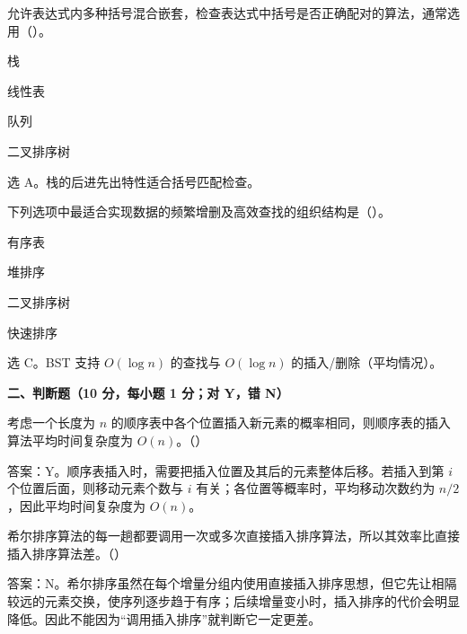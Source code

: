 \begin{question}
允许表达式内多种括号混合嵌套，检查表达式中括号是否正确配对的算法，通常选用（\quad）。
\begin{choiceoptions}[2]
  \item 栈
  \item 线性表
  \item 队列
  \item 二叉排序树
\end{choiceoptions}
\begin{solution}
选 A。栈的后进先出特性适合括号匹配检查。
\end{solution}
\end{question}

\begin{question}
下列选项中最适合实现数据的频繁增删及高效查找的组织结构是（\quad）。
\begin{choiceoptions}[2]
  \item 有序表
  \item 堆排序
  \item 二叉排序树
  \item 快速排序
\end{choiceoptions}
\begin{solution}
选 C。BST 支持 $O(\log n)$ 的查找与 $O(\log n)$ 的插入/删除（平均情况）。
\end{solution}
\end{question}




\textbf{二、判断题（10 分，每小题 1 分；对 Y，错 N）}

\begin{question}
考虑一个长度为 $n$ 的顺序表中各个位置插入新元素的概率相同，则顺序表的插入算法平均时间复杂度为 $O(n)$。（\quad）
\begin{solution}
答案：Y。顺序表插入时，需要把插入位置及其后的元素整体后移。若插入到第 $i$ 个位置后面，则移动元素个数与 $i$ 有关；各位置等概率时，平均移动次数约为 $n/2$，因此平均时间复杂度为 $O(n)$。
\end{solution}
\end{question}

\begin{question}
希尔排序算法的每一趟都要调用一次或多次直接插入排序算法，所以其效率比直接插入排序算法差。（\quad）
\begin{solution}
答案：N。希尔排序虽然在每个增量分组内使用直接插入排序思想，但它先让相隔较远的元素交换，使序列逐步趋于有序；后续增量变小时，插入排序的代价会明显降低。因此不能因为“调用插入排序”就判断它一定更差。
\end{solution}
\end{question}


